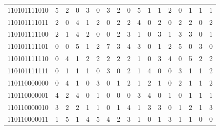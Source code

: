 \documentclass[10pt,a4paper]{article}
\begin{document}
\begin{longtable}{ |c|c|c|c|c|c|c|c|c|c|c|c|c|c|c|c|c| }
    110101111010              & 5                            & 2                                & 0                            & 3                              & 0   & 3   & 2   & 0   & 5   & 1   & 1   & 2   & 0   & 1   & 1   & 1   \\
    110101111011              & 2                            & 0                                & 4                            & 1                              & 2   & 0   & 2   & 2   & 4   & 0   & 2   & 0   & 2   & 2   & 0   & 2   \\
    110101111100              & 2                            & 1                                & 4                            & 2                              & 0   & 0   & 2   & 3   & 1   & 0   & 3   & 1   & 3   & 3   & 0   & 1   \\
    110101111101              & 0                            & 0                                & 5                            & 1                              & 2   & 7   & 3   & 4   & 3   & 0   & 1   & 2   & 5   & 0   & 3   & 0   \\
    110101111110              & 0                            & 4                                & 1                            & 2                              & 2   & 2   & 2   & 2   & 1   & 0   & 3   & 4   & 0   & 5   & 2   & 2   \\
    110101111111              & 0                            & 1                                & 1                            & 1                              & 0   & 3   & 0   & 2   & 1   & 4   & 0   & 0   & 3   & 1   & 1   & 2   \\
    110110000000              & 0                            & 4                                & 1                            & 0                              & 3   & 0   & 1   & 2   & 1   & 2   & 1   & 0   & 2   & 1   & 1   & 2   \\
    110110000001              & 4                            & 2                                & 4                            & 0                              & 1   & 0   & 0   & 0   & 3   & 4   & 0   & 1   & 0   & 1   & 1   & 1   \\
    110110000010              & 3                            & 2                                & 2                            & 1                              & 1   & 0   & 1   & 4   & 1   & 3   & 3   & 0   & 1   & 2   & 1   & 3   \\
    110110000011              & 1                            & 5                                & 1                            & 4                              & 5   & 4   & 2   & 3   & 1   & 0   & 1   & 3   & 1   & 1   & 0   & 0   \\

\end{longtable}
\end{document}
